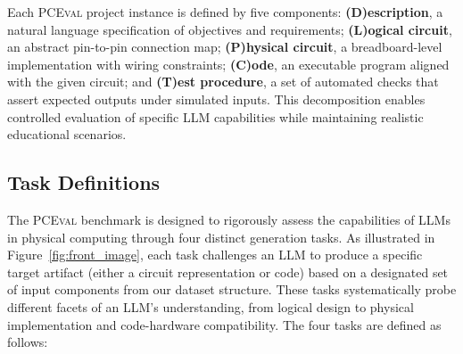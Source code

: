 \documentclass{article} %
\begin{document}

Each \textsc{PCEval} project instance is defined by five components:
\textbf{(D)escription}, a natural language specification of objectives and requirements; 
\textbf{(L)ogical circuit}, an abstract pin-to-pin connection map; 
\textbf{(P)hysical circuit}, a breadboard-level implementation with wiring constraints; 
\textbf{(C)ode}, an executable program aligned with the given circuit; and 
\textbf{(T)est procedure}, a set of automated checks that assert expected outputs under simulated inputs. 
This decomposition enables controlled evaluation of specific LLM capabilities while maintaining realistic educational scenarios.


\subsection{Task Definitions}
\label{sec:task_definitions}
The \textsc{PCEval} benchmark is designed to rigorously assess the capabilities of LLMs in physical computing through four distinct generation tasks.
As illustrated in Figure~\ref{fig:front_image}, each task challenges an LLM to produce a specific target artifact (either a circuit representation or code) based on a designated set of input components from our dataset structure.
These tasks systematically probe different facets of an LLM's understanding, from logical design to physical implementation and code-hardware compatibility.
The four tasks are defined as follows:
\end{document}
